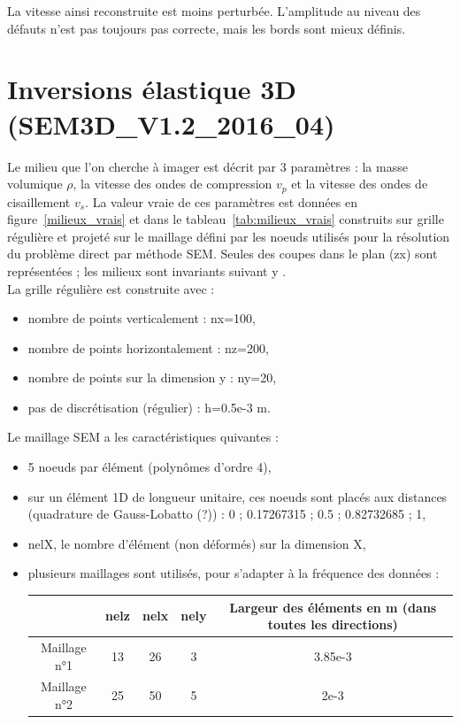 \documentclass[a4paper,11pt]{report} %
\begin{document}
La vitesse ainsi reconstruite est moins perturbée. L'amplitude au niveau des défauts n'est pas toujours pas correcte, mais les bords sont mieux définis. 

 
 
\section{Inversions élastique 3D (SEM3D\_V1.2\_2016\_04)}

Le milieu que l'on cherche à imager est décrit par 3 paramètres : la masse volumique $\rho$, la vitesse des ondes de compression $v_{p}$ et la vitesse des ondes de cisaillement $v_{s}$. La valeur vraie de ces paramètres est données en figure~\ref{milieux_vrais} et dans le tableau~\ref{tab:milieux_vrais} construits sur grille régulière et projeté sur le maillage défini par les noeuds utilisés pour la résolution du problème direct par méthode SEM. Seules des coupes dans le plan (zx) sont représentées ; les milieux sont invariants suivant y .\\

La grille régulière est construite avec : 
\begin{itemize}
	\item nombre de points verticalement : nx=100,
	\item nombre de points horizontalement : nz=200,
	\item nombre de points sur la dimension y : ny=20,
	\item pas de discrétisation (régulier) : h=0.5e-3 m.\\
\end{itemize}

Le maillage SEM a les caractéristiques quivantes : 
\begin{itemize}
	\item 5 noeuds par élément (polynômes d'ordre 4),
	\item sur un élément 1D de longueur unitaire, ces noeuds sont placés aux distances (quadrature de Gauss-Lobatto (?)) : 0 ; 0.17267315 ; 0.5 ; 0.82732685 ; 1,
	\item nelX, le nombre d'élément (non déformés) sur la dimension X,
	\item plusieurs maillages sont utilisés, pour s'adapter à la fréquence des données : \\
	\begin{tabular}{c || c | c | c | c}
						&	nelz	&	nelx	&	nely	&	Largeur des éléments en m (dans toutes les directions) \\ \hline \hline
		Maillage n°1	&	13		&	26		&	3		&	3.85e-3	\\ \hline
		Maillage n°2	&	25		&	50		&	5		&	2e-3	\\ 	
	\end{tabular}
\end{itemize}
\end{document}
